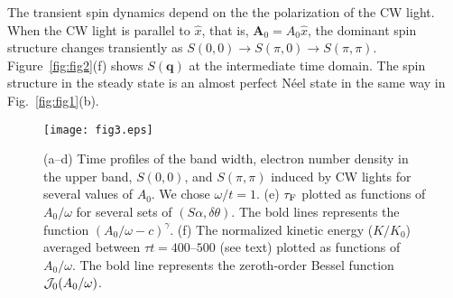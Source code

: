 \documentclass[aps,twocolumn,showpacs,prl,amsmath,amssymb]{revtex4-1}
\begin{document}
The transient spin dynamics depend on the the polarization of the CW light. 
When the CW light is parallel to $\hat x$, that is, $\bm{A}_0=A_0\hat x$, 
the dominant spin structure changes transiently as $S(0,0) \rightarrow S(\pi, 0) \rightarrow S(\pi, \pi)$.
Figure~\ref{fig:fig2}(f) shows $S(\bm{q})$ at the intermediate time domain. 
The spin structure in the steady state is an almost perfect N\'eel state in the same way in Fig.~\ref{fig:fig1}(b). 


\begin{figure}[t]
\begin{center}
\texttt{[image: fig3.eps]}
\end{center}
\caption{
(a--d) Time profiles of the band width, electron number density in the upper band, $S(0, 0)$, and $S(\pi, \pi)$ induced by CW lights for several values of $A_0$.
We chose $\omega/t=1$. 
(e) $\tau_{\rm F}$ plotted as functions of $A_0/\omega$ for several sets of $(S\alpha, \delta \theta)$. 
The bold lines represents the function $(A_0/\omega-c)^{\gamma}$. 
(f) The normalized kinetic energy ($K/K_0$) averaged between $\tau t=400$--$500$ (see text) plotted as functions of $A_0/\omega$. 
The bold line represents the zeroth-order Bessel function ${\cal J}_0(A_0/\omega)$. 
}
\label{fig:fig3}
\end{figure}
\end{document}
